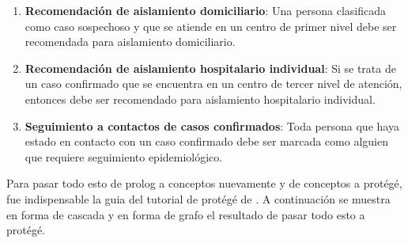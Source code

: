 \documentclass[11pt, letterpaper]{article}
\begin{document}
\begin{enumerate}
	\item \textbf{Recomendación de aislamiento domiciliario}: Una persona clasificada como caso sospechoso y que se atiende en un centro de primer nivel debe ser recomendada para aislamiento domiciliario.
	
	\item \textbf{Recomendación de aislamiento hospitalario individual}: Si se trata de un caso confirmado que se encuentra en un centro de tercer nivel de atención, entonces debe ser recomendado para aislamiento hospitalario individual.
	
	\item \textbf{Seguimiento a contactos de casos confirmados}: Toda persona que haya estado en contacto con un caso confirmado debe ser marcada como alguien que requiere seguimiento epidemiológico.
\end{enumerate}

\newpage 

Para pasar todo esto de prolog a conceptos nuevamente y de conceptos  a protégé, fue indispensable la guia del tutorial de protégé de \cite{debellis2021practical}. A continuación se muestra en forma de cascada y en forma de grafo el resultado de pasar todo esto a protégé.
\end{document}
